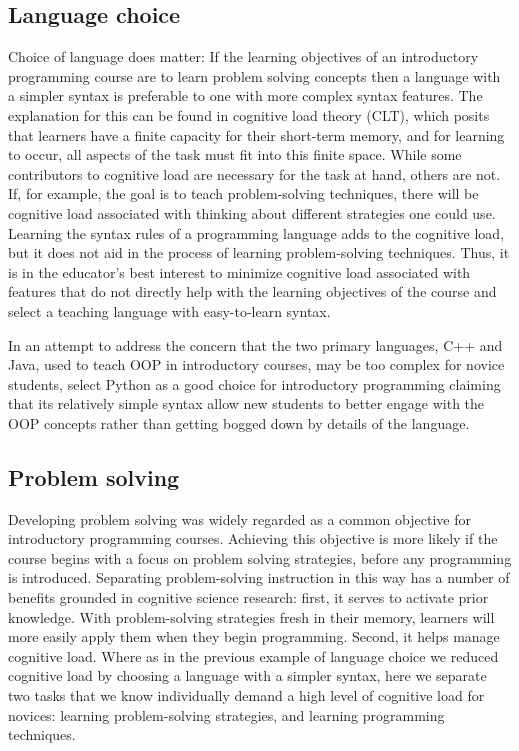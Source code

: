 \documentclass[12pt]{article}
\begin{document}
\subsection{Language choice}
Choice of language does matter: If the learning objectives of an
introductory programming course are to learn problem solving concepts
then a language with a simpler syntax is preferable to one with more
complex syntax features\autocite{koulouri_teaching_2014}. The
explanation for this can be found in cognitive load theory (CLT),
which posits that learners have a finite capacity for their short-term
memory, and for learning to occur, all aspects of the task must fit
into this finite space. While some contributors to cognitive load are
necessary for the task at hand, others are
not\autocite{paas_cognitive_2003}. If, for example, the goal is to
teach problem-solving techniques, there will be cognitive load
associated with thinking about different strategies one could
use. Learning the syntax rules of a programming language adds to the
cognitive load, but it does not aid in the process of learning
problem-solving techniques. Thus, it is in the educator's best
interest to minimize cognitive load associated with features that do
not directly help with the learning objectives of the course and
select a teaching language with easy-to-learn syntax.

In an attempt to address the concern that the two primary languages,
C++ and Java, used to teach OOP in introductory courses, may be too
complex for novice students, \citeauthor{goldwasser_teaching_2008}
select Python as a good choice for introductory programming claiming
that its relatively simple syntax allow new students to better engage
with the OOP concepts rather than getting bogged down by details of
the language\autocite{goldwasser_teaching_2008}.

\subsection{Problem solving}
Developing problem solving was widely regarded as a common objective
for introductory programming courses. Achieving this objective is more
likely if the course begins with a focus on problem solving
strategies, before any programming is
introduced\autocite{koulouri_teaching_2014}. Separating
problem-solving instruction in this way has a number of benefits
grounded in cognitive science research: first, it serves to activate
prior knowledge\autocite{ambrose_how_2010}. With problem-solving
strategies fresh in their memory, learners will more easily apply them
when they begin programming. Second, it helps manage cognitive
load. Where as in the previous example of language choice we reduced
cognitive load by choosing a language with a simpler syntax, here we
separate two tasks that we know individually demand a high level of
cognitive load for novices: learning problem-solving strategies, and
learning programming techniques.
\end{document}
